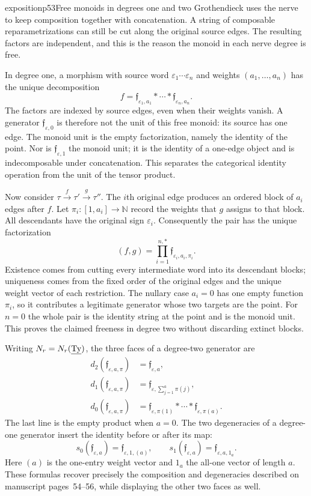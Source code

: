 \begin{dcomment}{exposition}{p53}{Free monoids in degrees one and two}
Grothendieck uses the nerve to keep composition together with concatenation. A string of composable reparametrizations can still be cut along the original source edges. The resulting factors are independent, and this is the reason the monoid in each nerve degree is free.

In degree one, a morphism with source word $\varepsilon_1\cdots\varepsilon_n$ and weights $(a_1,\ldots,a_n)$ has the unique decomposition
\[
 f=\mathfrak f_{\varepsilon_1,a_1}*\cdots*
       \mathfrak f_{\varepsilon_n,a_n}.
\]
The factors are indexed by source edges, even when their weights vanish. A generator $\mathfrak f_{\varepsilon,0}$ is therefore not the unit of this free monoid: its source has one edge. The monoid unit is the empty factorization, namely the identity of the point. Nor is $\mathfrak f_{\varepsilon,1}$ the monoid unit; it is the identity of a one-edge object and is indecomposable under concatenation. This separates the categorical identity operation from the unit of the tensor product.

Now consider $\tau\xrightarrow f\tau'\xrightarrow g\tau''$. The $i$th original edge produces an ordered block of $a_i$ edges after $f$. Let $\pi_i:[1,a_i]\to\mathbb N$ record the weights that $g$ assigns to that block. All descendants have the original sign $\varepsilon_i$. Consequently the pair has the unique factorization
\[
 (f,g)=\prod_{i=1}^{n,*}\mathfrak f_{\varepsilon_i,a_i,\pi_i}.
\]
Existence comes from cutting every intermediate word into its descendant blocks; uniqueness comes from the fixed order of the original edges and the unique weight vector of each restriction. The nullary case $a_i=0$ has one empty function $\pi_i$, so it contributes a legitimate generator whose two targets are the point. For $n=0$ the whole pair is the identity string at the point and is the monoid unit. This proves the claimed freeness in degree two without discarding extinct blocks.

Writing $N_r=N_r(\underline{\mathrm{Ty}})$, the three faces of a degree-two generator are
\[
\begin{aligned}
 d_2(\mathfrak f_{\varepsilon,a,\pi})
    &=\mathfrak f_{\varepsilon,a},\\
 d_1(\mathfrak f_{\varepsilon,a,\pi})
    &=\mathfrak f_{\varepsilon,\sum_{j=1}^{a}\pi(j)},\\
 d_0(\mathfrak f_{\varepsilon,a,\pi})
    &=\mathfrak f_{\varepsilon,\pi(1)}*\cdots*
        \mathfrak f_{\varepsilon,\pi(a)}.
\end{aligned}
\]
The last line is the empty product when $a=0$. The two degeneracies of a degree-one generator insert the identity before or after its map:
\[
 s_0(\mathfrak f_{\varepsilon,a})
       =\mathfrak f_{\varepsilon,1,(a)},\qquad
 s_1(\mathfrak f_{\varepsilon,a})
       =\mathfrak f_{\varepsilon,a,1_a}.
\]
Here $(a)$ is the one-entry weight vector and $1_a$ the all-one vector of length $a$. These formulas recover precisely the composition and degeneracies described on manuscript pages~54--56, while displaying the other two faces as well.


\end{dcomment}
